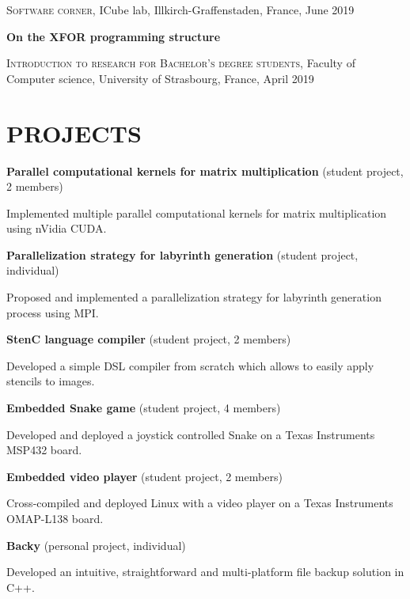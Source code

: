 \documentclass[a4paper, 11pt]{article}
\begin{document}
\textsc{Software corner}, ICube lab, Illkirch-Graffenstaden, France, June 2019

\vspace{.7em}

\textbf{On the XFOR programming structure}

\textsc{Introduction to research for Bachelor's degree students}, Faculty of
Computer science, University of Strasbourg, France, April 2019

\section*{PROJECTS}

\textbf{Parallel computational kernels for matrix multiplication} (student
project, 2 members)

Implemented multiple parallel computational kernels for matrix multiplication
using nVidia CUDA.

\vspace{.7em}

\textbf{Parallelization strategy for labyrinth generation} (student project,
individual)

Proposed and implemented a parallelization strategy for labyrinth generation
process using MPI.

\vspace{.7em}

\textbf{StenC language compiler} (student project, 2 members)

Developed a simple DSL compiler from scratch which allows to easily apply
stencils to images.

\vspace{.7em}

\textbf{Embedded Snake game} (student project, 4 members)

Developed and deployed a joystick controlled Snake on a Texas Instruments MSP432
board.

\vspace{.7em}

\textbf{Embedded video player} (student project, 2 members)

Cross-compiled and deployed Linux with a video player on a Texas Instruments
OMAP-L138 board.

\vspace{.7em}

\textbf{Backy} (personal project, individual)

Developed an intuitive, straightforward and multi-platform file backup solution
in C++.
\end{document}
